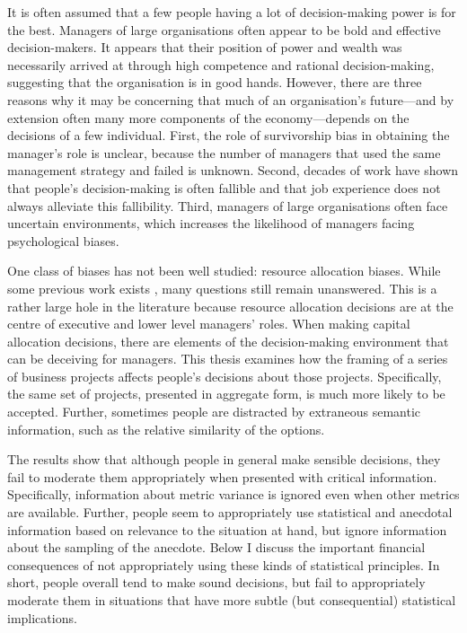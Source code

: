 \documentclass[a4paper, nobind, dvipsnames]{templates/ociamthesis}
\theoremstyle{definition}
\theoremstyle{definition}
\theoremstyle{definition}
\theoremstyle{definition}
\theoremstyle{remark}
\begin{document}
It is often assumed that a few people having a lot of decision-making power is
for the best. Managers of large organisations often appear to be bold and
effective decision-makers. It appears that their position of power and wealth
was necessarily arrived at through high competence and rational decision-making,
suggesting that the organisation is in good hands. However, there are three
reasons why it may be concerning that much of an organisation's future---and by
extension often many more components of the economy---depends on the decisions
of a few individual. First, the role of survivorship bias in obtaining the
manager's role is unclear, because the number of managers that used the same
management strategy and failed is unknown. Second, decades of work have shown
that people's decision-making is often fallible and that job experience does not
always alleviate this fallibility. Third, managers of large organisations often
face uncertain environments, which increases the likelihood of managers facing
psychological biases.

One class of biases has not been well studied: resource allocation biases. While
some previous work exists \autocite[e.g.,][]{bardolet2011}, many questions still remain
unanswered. This is a rather large hole in the literature because resource
allocation decisions are at the centre of executive and lower level managers'
roles. When making capital allocation decisions, there are elements of the
decision-making environment that can be deceiving for managers. This thesis
examines how the framing of a series of business projects affects people's
decisions about those projects. Specifically, the same set of projects,
presented in aggregate form, is much more likely to be accepted. Further,
sometimes people are distracted by extraneous semantic information, such as the
relative similarity of the options.

The results show that although people in general make sensible decisions, they
fail to moderate them appropriately when presented with critical information.
Specifically, information about metric variance is ignored even when other
metrics are available. Further, people seem to appropriately use statistical and
anecdotal information based on relevance to the situation at hand, but ignore
information about the sampling of the anecdote. Below I discuss the important
financial consequences of not appropriately using these kinds of statistical
principles. In short, people overall tend to make sound decisions, but fail to
appropriately moderate them in situations that have more subtle (but
consequential) statistical implications.
\end{document}
